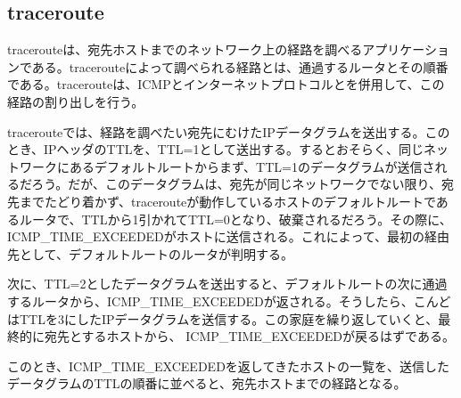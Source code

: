 \subsection{traceroute}

tracerouteは、宛先ホストまでのネットワーク上の経路を調べるアプリケーションである。tracerouteによって調べられる経路とは、通過するルータとその順番である。tracerouteは、ICMPとインターネットプロトコルとを併用して、この経路の割り出しを行う。

tracerouteでは、経路を調べたい宛先にむけたIPデータグラムを送出する。このとき、IPヘッダのTTLを、TTL=1として送出する。するとおそらく、同じネットワークにあるデフォルトルートからまず、TTL=1のデータグラムが送信されるだろう。だが、このデータグラムは、宛先が同じネットワークでない限り、宛先までたどり着かず、tracerouteが動作しているホストのデフォルトルートであるルータで、TTLから1引かれてTTL=0となり、破棄されるだろう。その際に、ICMP\_TIME\_EXCEEDEDがホストに送信される。これによって、最初の経由先として、デフォルトルートのルータが判明する。

次に、TTL=2としたデータグラムを送出すると、デフォルトルートの次に通過するルータから、ICMP\_TIME\_EXCEEDEDが返される。そうしたら、こんどはTTLを3にしたIPデータグラムを送信する。この家庭を繰り返していくと、最終的に宛先とするホストから、 ICMP\_TIME\_EXCEEDEDが戻るはずである。

このとき、ICMP\_TIME\_EXCEEDEDを返してきたホストの一覧を、送信したデータグラムのTTLの順番に並べると、宛先ホストまでの経路となる。

